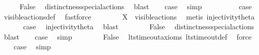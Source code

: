 \begin{isabellebody}
\ {}\isanewline
\ \ \isamarkupfalse%
\ False\ \isamarkupfalse%
\ distinctness{\isacharunderscore}{\kern0pt}special{\isacharunderscore}{\kern0pt}actions\ \isamarkupfalse%
\ blast\isanewline
\ \ \isamarkupfalse%
\ {\isacharquery}{\kern0pt}case\ \isamarkupfalse%
\ simp\isanewline
{}\isamarkupfalse%
\isanewline
\ \ \isamarkupfalse%
\ {}\isanewline
\ \ \isamarkupfalse%
\ \isamarkupfalse%
\ {\isacharquery}{\kern0pt}case\ \isamarkupfalse%
\ visible{\isacharunderscore}{\kern0pt}actions{\isacharunderscore}{\kern0pt}def\ \isamarkupfalse%
\ fastforce\isanewline
{}\isamarkupfalse%
\isanewline
\ \ \isamarkupfalse%
\ {}\isanewline
\ \ \isamarkupfalse%
\ {\isacartoucheopen}X\ {\isasymsubseteq}\ visible{\isacharunderscore}{\kern0pt}actions{\isacartoucheclose}\ \isamarkupfalse%
\ {\isacharparenleft}{\kern0pt}metis\ injectivity{\isacharunderscore}{\kern0pt}theta{\isacharparenleft}{\kern0pt}{}{\isacharparenright}{\kern0pt}{\isacharparenright}{\kern0pt}\isanewline
\ \ \isamarkupfalse%
\ {}\ \isamarkupfalse%
\ {\isacharquery}{\kern0pt}case\ \isamarkupfalse%
\ injectivity{\isacharunderscore}{\kern0pt}theta{\isacharparenleft}{\kern0pt}{}{\isacharparenright}{\kern0pt}\ \isamarkupfalse%
\ blast\isanewline
{}\isamarkupfalse%
\isanewline
\ \ \isamarkupfalse%
\ {}\isanewline
\ \ \isamarkupfalse%
\ False\ \isamarkupfalse%
\ distinctness{\isacharunderscore}{\kern0pt}special{\isacharunderscore}{\kern0pt}actions\ \isamarkupfalse%
\ blast\isanewline
\ \ \isamarkupfalse%
\ {\isacharquery}{\kern0pt}case\ \isamarkupfalse%
\ simp\isanewline
{}\isamarkupfalse%
\isanewline
\ \ \isamarkupfalse%
\ {}\isanewline
\ \ \isamarkupfalse%
\ False\ \isamarkupfalse%
\ lts{\isacharunderscore}{\kern0pt}timeout{\isacharunderscore}{\kern0pt}axioms\ lts{\isacharunderscore}{\kern0pt}timeout{\isacharunderscore}{\kern0pt}def\ \isamarkupfalse%
\ force\isanewline
\ \ \isamarkupfalse%
\ {\isacharquery}{\kern0pt}case\ \isamarkupfalse%
\ simp\isanewline
{}\isamarkupfalse%
%

\end{isabellebody}
